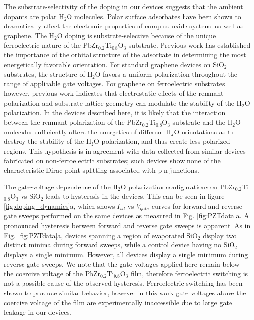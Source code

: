 \documentclass[edeposit,fullpage,draftthesis]{uiucthesis2009}
\begin{document}
The substrate-selectivity of the doping in our devices suggests that the ambient dopants are polar H$_2$O molecules. Polar surface adsorbates have been shown to dramatically affect the electronic properties of complex oxide systems\cite{Xie2011} as well as graphene\cite{Schedin2007, Lohmann2009,Lu2014}. The H$_2$O doping is substrate-selective because of the unique ferroelectric nature of the PbZr$_{0.2}$Ti$_{0.8}$O$_3$ substrate. Previous work\cite{Leenaerts2007,Leenaerts2009} has established the importance of the orbital structure of the adsorbate in determining the most energetically favorable orientation. For standard graphene devices on SiO$_2$ substrates, the structure of H$_2$O favors a uniform polarization throughout the range of applicable gate voltages. For graphene on ferroelectric substrates however, previous work\cite{Lu2014} indicates that electrostatic effects of the remnant polarization and substrate lattice geometry can modulate the stability of the H$_2$O polarization. In the devices described here, it is likely that the interaction between the remnant polarization of the PbZr$_{0.2}$Ti$_{0.8}$O$_3$ substrate and the H$_2$O molecules sufficiently alters the energetics of different H$_2$O orientations as to destroy the stability of the H$_2$O polarization, and thus create less-polarized regions. This hypothesis is in agreement with data collected from similar devices fabricated on non-ferroelectric substrates; such devices show none of the characteristic Dirac point splitting associated with p-n junctions.

The gate-voltage dependence of the H$_2$O polarization configurations on PbZr$_{0.2}$Ti$_{0.8}$O$_3$ vs SiO$_2$ leads to hysteresis in the devices. This can be seen in figure \ref{fig:doping_dynamics}a, which shows $I_{sd}$ vs $V_{gate}$ curves for forward and reverse gate sweeps performed on the same devices as measured in Fig. \ref{fig:PZTdata}a. A pronounced hysteresis between forward and reverse gate sweeps is apparent. As in Fig. \ref{fig:PZTdata}a, devices spanning a region of evaporated SiO$_2$ display two distinct minima during forward sweeps, while a control device having no SiO$_2$ displays a single minimum. However, all devices display a single minimum during reverse gate sweeps. We note that the gate voltages applied here remain below the coercive voltage of the PbZr$_{0.2}$Ti$_{0.8}$O$_3$ film, therefore ferroelectric switching is not a possible cause of the observed hysteresis. Ferroelectric switching has been shown to produce similar behavior\cite{Park2015b}, however in this work gate voltages above the coercive voltage of the film are experimentally inaccessible due to large gate leakage in our devices.
\end{document}
